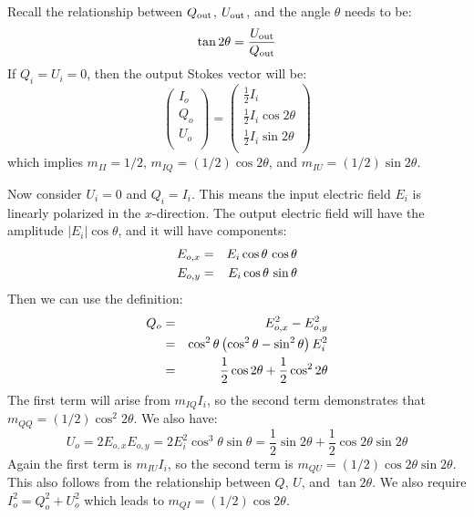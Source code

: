 \documentclass[11pt, preprint]{article}
\begin{document}
\begin{enumerate}
\begin{enumerate}
\begin{answer}
    Recall the relationship between $Q_{\rm out}$, $U_{\rm out}$, and
    the angle $\theta$ needs to be:
    \begin{equation}
      \tan 2\theta  = \frac{U_{\rm out}}{Q_{\rm out}}
    \end{equation}
    If $Q_i=U_i=0$, then the output Stokes vector will be:
    \begin{equation}
      \begin{pmatrix}
        I_o \\
        Q_o \\
        U_o \\
      \end{pmatrix} =
      \begin{pmatrix}
        \frac{1}{2} I_i \\
        \frac{1}{2} I_i \cos 2\theta \\
        \frac{1}{2} I_i \sin 2\theta \\
      \end{pmatrix}
    \end{equation}
    which implies $m_{II}=1/2$, $m_{IQ} = (1/2) \cos 2\theta$, and
    $m_{IU} = (1/2) \sin 2\theta$.

    Now consider $U_i=0$ and $Q_i=I_i$. This means the input electric
    field $E_i$ is linearly polarized in the $x$-direction. The output
    electric field will have the amplitude $|E_i| \cos\theta$, and it
    will have components:
    \begin{eqnarray}
      E_{o, x} &=& E_i \cos\theta\, \cos\theta \cr
      E_{o, y} &=& E_i \cos\theta\, \sin\theta
    \end{eqnarray}
    Then we can use the definition:
    \begin{eqnarray}
      Q_o &=& E_{o,x}^2 - E_{o,y}^2\cr &=& \cos^2\theta \left(\cos^2\theta -
      \sin^2\theta\right) E_i^2\cr &=& \frac{1}{2}\cos 2\theta +
      \frac{1}{2}\cos^2 2\theta
    \end{eqnarray}
    The first term will arise from $m_{IQ}I_i$, so the second term
    demonstrates that $m_{QQ} = (1/2) \cos^2 2\theta$. We also have:
    \begin{equation}
      U_o = 2 E_{o,x}E_{o,y} = 2 E_i^2 \cos^3\theta \sin\theta
      = \frac{1}{2} \sin 2\theta + \frac{1}{2} \cos 2\theta \sin
      2\theta
    \end{equation}
    Again the first term is $m_{IU}I_i$, so the second term is $m_{QU}
    = (1/2) \cos 2\theta \sin 2\theta$. This also follows from the
    relationship between $Q$, $U$, and $\tan 2\theta$.
    We also require
    $I_o^2 = Q_o^2 + U_o^2$ which leads to $m_{QI} = (1/2) \cos
    2\theta$.


\end{answer}
\end{enumerate}
\end{enumerate}
\end{document}

